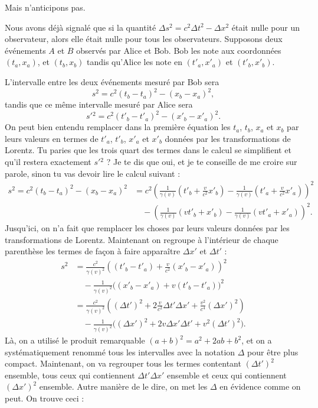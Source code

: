 Mais n'anticipons pas.

Nous avons déjà signalé que si la quantité $\Delta s^2=c^2\Delta t^2-\Delta x^2$ était nulle pour un observateur, alors elle était nulle pour tous les observateurs. Supposons deux événements $A$ et $B$ observés par Alice et Bob. Bob les note aux coordonnées $(t_a,x_a)$, et $(t_b,x_b)$ tandis qu'Alice les note en $(t'_a,x'_a)$ et $(t'_b,x'_b)$.

L'intervalle entre les deux événements mesuré par Bob sera
\[ 
   s^2=c^2(t_b-t_a)^2-(x_b-x_a)^2,
\]
tandis que ce même intervalle mesuré par Alice sera
\[ 
  s'{}^2=c^2(t'_b-t'_a)^2-(x'_b-x'_a)^2.
\]
On peut bien entendu remplacer dans la première équation les $t_a$, $t_b$, $x_a$ et $x_b$ par leurs valeurs en termes de $t'_a$, $t'_b$, $x'_a$ et $x'_b$ données par les transformations de Lorentz. Tu paries que les trois quart des termes dans le calcul se simplifient et qu'il restera exactement $s'{}^2$ ? Je te dis que oui, et je te conseille de me croire sur parole, sinon tu vas devoir lire le calcul suivant :
\begin{align*}
s^2=c^2(t_b-t_a)^2-(x_b-x_a)^2&=c^2\left(   \frac{1}{ \gamma(v) }(t'_b+\frac{ v }{ c^2 }x'_b)-\frac{1}{ \gamma(v) }(t'_a+\frac{ v }{ c^2 }x'_a)   \right)^2\\
			&\quad-\left(  \frac{1}{ \gamma(v) }(vt'_b+x'_b)-\frac{1}{ \gamma(v) }(vt'_a+x'_a)  \right)^2.
\end{align*}
Jusqu'ici, on n'a fait que remplacer les choses par leurs valeurs données par les transformations de Lorentz. Maintenant on regroupe à l'intérieur de chaque parenthèse les termes de façon à faire apparaître $\Delta x'$ et $\Delta t'$ :
\begin{align*}
s^2	&=\frac{ c^2 }{ \gamma(v)^2 }\left( (t'_b-t'_a)+\frac{ v }{ c^2 }(x'_b-x'_a) \right)^2\\
	&\quad-\frac{1}{ \gamma(v)^2 }\big( (x'_b-x'_a)+v(t'_b-t'_a) \big)^2\\
	&=\frac{ c^2 }{ \gamma(v)^2 }\left( (\Delta t')^2+2\frac{ v }{ c^2 }\Delta t'\Delta x'+\frac{ v^2 }{ c^4 }(\Delta x')^2 \right)\\
	&\quad-\frac{1}{ \gamma(v)^2 }\Big( (\Delta x')^2+2v\Delta x'\Delta t'+v^2(\Delta t')^2 \Big).
\end{align*}
Là, on a utilisé le produit remarquable $(a+b)^2=a^2+2ab+b^2$, et on a systématiquement renommé tous les intervalles avec la notation $\Delta$ pour être plus compact. Maintenant, on va regrouper tous les termes contentant $(\Delta t')^2$ ensemble, tous ceux qui contiennent $\Delta t'\Delta x'$ ensemble et ceux qui contiennent $(\Delta x')^2$ ensemble. Autre manière de le dire, on met les $\Delta$ en évidence comme on peut. On trouve ceci :
